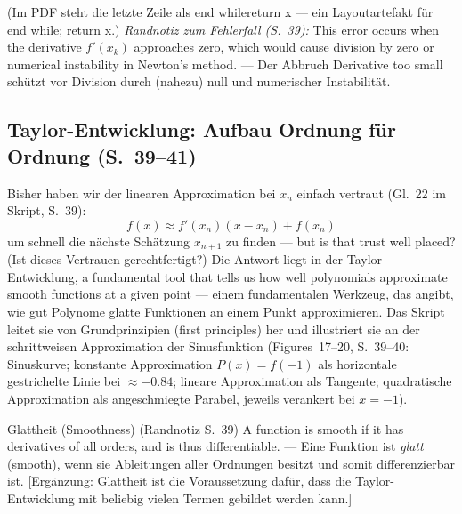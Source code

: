 \noindent (Im PDF steht die letzte Zeile als \glqq end whilereturn x\grqq{} — ein Layoutartefakt für \glqq end while; return x\grqq.) \emph{Randnotiz zum Fehlerfall (S.~39):} \glqq This error occurs when the derivative $f'(x_k)$ approaches zero, which would cause division by zero or numerical instability in Newton's method.\grqq{} — Der Abbruch \glqq Derivative too small\grqq{} schützt vor Division durch (nahezu) null und numerischer Instabilität.

\subsection{Taylor-Entwicklung: Aufbau Ordnung für Ordnung (S.~39--41)}
Bisher haben wir der linearen Approximation bei $x_n$ einfach vertraut (Gl.~22 im Skript, S.~39):
\[ f(x) \approx f'(x_n)(x - x_n) + f(x_n) \tag{Gl.~22} \]
um schnell die nächste Schätzung $x_{n+1}$ zu finden — \glqq but is that trust well placed?\grqq{} (Ist dieses Vertrauen gerechtfertigt?) Die Antwort liegt in der Taylor-Entwicklung, \glqq a fundamental tool that tells us how well polynomials approximate smooth functions at a given point\grqq{} — einem fundamentalen Werkzeug, das angibt, wie gut Polynome glatte Funktionen an einem Punkt approximieren. Das Skript leitet sie von Grundprinzipien (first principles) her und illustriert sie an der schrittweisen Approximation der Sinusfunktion (Figures~17--20, S.~39--40: Sinuskurve; konstante Approximation $P(x) = f(-1)$ als horizontale gestrichelte Linie bei $\approx -0.84$; lineare Approximation als Tangente; quadratische Approximation als angeschmiegte Parabel, jeweils verankert bei $x=-1$).

\begin{defbox}{Glattheit (Smoothness) (Randnotiz S.~39)}
\glqq A function is smooth if it has derivatives of all orders, and is thus differentiable.\grqq{} — Eine Funktion ist \emph{glatt} (smooth), wenn sie Ableitungen aller Ordnungen besitzt und somit differenzierbar ist. [Ergänzung: Glattheit ist die Voraussetzung dafür, dass die Taylor-Entwicklung mit beliebig vielen Termen gebildet werden kann.]
\end{defbox}

